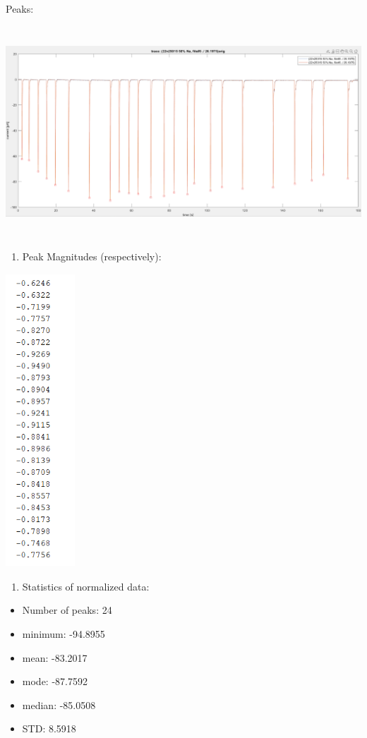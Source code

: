 Peaks:

\includegraphics[width=6.5in,height=3.11111in]{media/image40.png}

\begin{enumerate}
\def\labelenumi{\arabic{enumi}.}
\item
  Peak Magnitudes (respectively):
\end{enumerate}

\includegraphics[width=1.02604in,height=4.33024in]{media/image15.png}

\begin{enumerate}
\def\labelenumi{\arabic{enumi}.}
\setcounter{enumi}{1}
\item
  Statistics of normalized data:
\end{enumerate}

\begin{itemize}
\item
  Number of peaks: 24
\item
  minimum: -94.8955
\item
  mean: -83.2017
\item
  mode: -87.7592
\item
  median: -85.0508
\item
  STD: 8.5918
\end{itemize}

